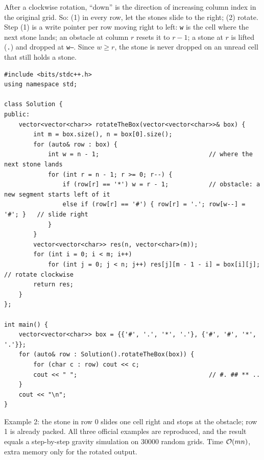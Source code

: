 \begin{solutionbox}
After a clockwise rotation, ``down'' is the direction of increasing column index in the original grid. So: (1) in every row, let the stones slide to the right; (2) rotate. Step (1) is a write pointer per row moving right to left: \texttt{w} is the cell where the next stone lands; an obstacle at column $r$ resets it to $r - 1$; a stone at $r$ is lifted (\texttt{.}) and dropped at \texttt{w--}. Since $w \ge r$, the stone is never dropped on an unread cell that still holds a stone.
\begin{lstlisting}[style=cpp]
#include <bits/stdc++.h>
using namespace std;

class Solution {
public:
    vector<vector<char>> rotateTheBox(vector<vector<char>>& box) {
        int m = box.size(), n = box[0].size();
        for (auto& row : box) {
            int w = n - 1;                              // where the next stone lands
            for (int r = n - 1; r >= 0; r--) {
                if (row[r] == '*') w = r - 1;           // obstacle: a new segment starts left of it
                else if (row[r] == '#') { row[r] = '.'; row[w--] = '#'; }   // slide right
            }
        }
        vector<vector<char>> res(n, vector<char>(m));
        for (int i = 0; i < m; i++)
            for (int j = 0; j < n; j++) res[j][m - 1 - i] = box[i][j];   // rotate clockwise
        return res;
    }
};

int main() {
    vector<vector<char>> box = {{'#', '.', '*', '.'}, {'#', '#', '*', '.'}};
    for (auto& row : Solution().rotateTheBox(box)) {
        for (char c : row) cout << c;
        cout << " ";                                    // #. ## ** ..
    }
    cout << "\n";
}
\end{lstlisting}
\begin{center}
\end{center}
Example 2: the stone in row 0 slides one cell right and stops at the obstacle; row 1 is already packed. All three official examples are reproduced, and the result equals a step-by-step gravity simulation on 30000 random grids. Time $\mathcal{O}(mn)$, extra memory only for the rotated output.
\end{solutionbox}

